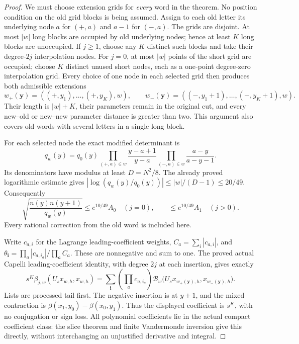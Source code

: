 \begin{proof}
We must choose extension grids for \emph{every} word in
the theorem.  No position condition on the old grid blocks
is being assumed.  Assign to each old letter its underlying
node $a$ for $(+,a)$ and $a-1$ for $(-,a)$.  The grids
are disjoint.  At most $|w|$ long blocks are occupied by
old underlying nodes; hence at least $K$ long blocks are
unoccupied.  If $j\ge1$, choose any $K$ distinct such
blocks and take their degree-$2j$ interpolation nodes.
For $j=0$, at most $|w|$ points of the short grid are
occupied; choose $K$ distinct unused short nodes, each
as a one-point degree-zero interpolation grid.  Every
choice of one node in each selected grid then produces
both admissible extensions
\[
 w_+(\boldsymbol y)=((+,y_1),\ldots,(+,y_K),w),\qquad
 w_-(\boldsymbol y)=((-,y_1+1),\ldots,(-,y_K+1),w).
\]
Their length is $|w|+K$, their parameters remain in the
original cut, and every new--old or new--new parameter
distance is greater than two.  This argument also covers
old words with several letters in a single long block.

For each selected node the exact modified determinant is
\[
 q_w(y)=q_0(y)
  \prod_{(+,a)\in w}\frac{y-a+1}{y-a}
  \prod_{(-,a)\in w}\frac{a-y}{a-y-1}.
\]
Its denominators have modulus at least $D=N^2/8$.
The already proved logarithmic estimate gives
$|\log(q_w(y)/q_0(y))|\le |w|/(D-1)\le20/49$.
Consequently
\begin{equation}\label{kernel-fourier-q-ratio}
 \sqrt{\frac{n(y)n(y+1)}{q_w(y)}}
       \le e^{10/49}A_0\quad(j=0),\qquad
       \le e^{10/49}A_1\quad(j>0).
\end{equation}
Every rational correction from the old word is included here.

Write $c_{a,i}$ for the Lagrange leading-coefficient weights,
$C_a=\sum_i|c_{a,i}|$, and
$\theta_{\boldsymbol i}=\prod_a|c_{a,i_a}|/\prod_a C_a$.
These are nonnegative and sum to one.  The proved actual
Capelli leading-coefficient identity, with degree $2j$ at
each insertion, gives exactly
\[
 s^K\beta_{j,w}(U_sx_{w,h},x_{w,h})
  =\sum_{\boldsymbol i}\left(\prod_a c_{a,i_a}\right)
       \mathcal B_w\bigl(U_sx_{w_+(\boldsymbol y),h},
                              x_{w_-(\boldsymbol y),h}\bigr).
\]
Lists are processed tail first.  The negative insertion is
at $y+1$, and the mixed contraction is
$\beta(x_1,y_0)-\beta(x_0,y_1)$.  Thus the displayed
coefficient is $s^K$, with no conjugation or sign loss.
All polynomial coefficients lie in the actual compact
coefficient class: the slice theorem and finite Vandermonde
inversion give this directly, without interchanging an
unjustified derivative and integral.


\end{proof}
